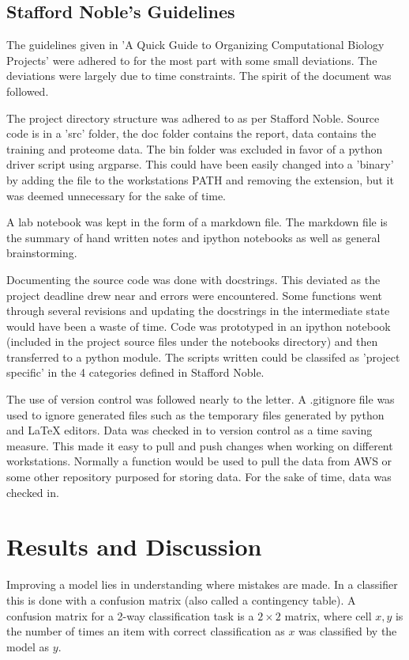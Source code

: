 \documentclass[10pt,letterpaper]{article}
\begin{document}
	\subsection*{Stafford Noble's Guidelines}
	The guidelines given in 'A Quick Guide to Organizing Computational Biology Projects' \cite{noble} were adhered to for the most part with some small deviations. The deviations were largely due to time constraints. The spirit of the document was followed.
	
	The project directory structure was adhered to as per Stafford Noble. Source code is in a 'src' folder, the doc folder contains the report, data contains the training and proteome data. The bin folder was excluded in favor of a python driver script using argparse. This could have been easily changed into a 'binary' by adding the file to the workstations PATH and removing the extension, but it was deemed unnecessary for the sake of time. 
	
	A lab notebook was kept in the form of a markdown file. The markdown file is the summary of hand written notes and ipython notebooks as well as general brainstorming. 
	
	Documenting the source code was done with docstrings. This deviated as the project deadline drew near and errors were encountered. Some functions went through several revisions and updating the docstrings in the intermediate state would have been a waste of time. Code was prototyped in an ipython notebook (included in the project source files under the notebooks directory) and then transferred to a python module. The scripts written could be classifed as 'project specific' in the 4 categories defined in Stafford Noble. 
	
	The use of version control was followed nearly to the letter. A .gitignore file was used to ignore generated files such as the temporary files generated by python and LaTeX editors. Data was checked in to version control as a time saving measure. This made it easy to pull and push changes when working on different workstations. Normally a function would be used to pull the data from AWS or some other repository purposed for storing data. For the sake of time, data was checked in. 
	\section*{Results and Discussion}
	
	Improving a model lies in understanding where mistakes are made. In a classifier this is done with a confusion matrix (also called a contingency table). A confusion matrix for a 2-way classification task is a $2 \times 2$ matrix, where cell $x,y$ is the number of times an item with correct classification as $x$ was classified by the model as $y$. 
\end{document}
